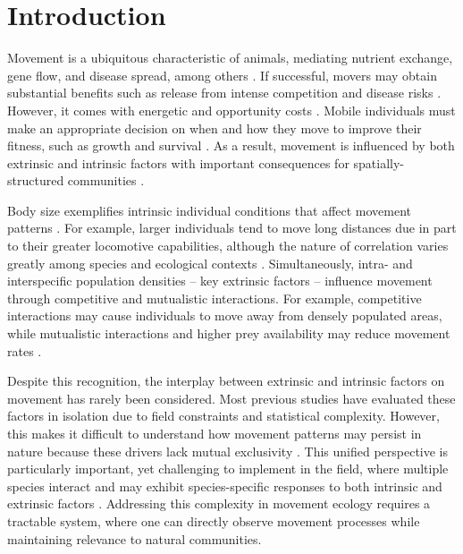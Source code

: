 \documentclass[11pt, class=article, crop=false]{standalone}
\begin{document}
\clearpage
{} 
\newpage

\section{Introduction}

Movement is a ubiquitous characteristic of animals, mediating nutrient exchange, gene flow, and disease spread, among others \citep{cookeMovementEcologyFishes2022, hessDiseaseMetapopulationModels1996, teruiParasiteInfectionInduces2017, fauschLandscapesRiverscapesBridging2002}.
If successful, movers may obtain substantial benefits such as release from intense competition and disease risks \citep{clobertDispersalEcologyEvolution2012, teruiParasiteInfectionInduces2017}.
However, it comes with energetic and opportunity costs \citep{bonteCostsDispersal2012}.
Mobile individuals must make an appropriate decision on when and how they move to improve their fitness, such as growth and survival \citep{bonteCostsDispersal2012}. As a result, movement is influenced by both extrinsic and intrinsic factors with important consequences for spatially-structured communities \citep{leiboldMetacommunityConceptFramework2004, mcpeekEvolutionPassiveDispersal2024, schlagelMovementmediatedCommunityAssembly2020}. 

Body size exemplifies intrinsic individual conditions that affect movement patterns \citep{clobertDispersalEcologyEvolution2012}. For example,  larger individuals tend to move long distances due in part to their greater locomotive capabilities, although the nature of correlation varies greatly among species and ecological contexts \citep{comteEvidenceDispersalSyndromes2018, teruiParasiteInfectionInduces2017, radingerPatternsPredictorsFish2014, debeffeConditiondependentNatalDispersal2012,gilliamMovementCorridorsEnhancement2001}.
Simultaneously, intra- and interspecific population densities -- key extrinsic factors -- influence movement through competitive and mutualistic interactions. For example, competitive interactions may cause individuals to move away from densely populated areas, while mutualistic interactions and higher prey availability may reduce movement rates \citep{thierryInterplayAbioticBiotic2024, rasmussenIndividualMovementStream2017, fronhoferBottomupTopdownControl2018}.

Despite this recognition, the interplay between extrinsic and intrinsic factors on movement has rarely been considered. Most previous studies have evaluated these factors in isolation due to field constraints and statistical complexity. However, this makes it difficult to understand how movement patterns may persist in nature because these drivers lack mutual exclusivity \citep{mcmahonLinkingHabitatSelection2006}. 
This unified perspective is particularly important, yet challenging to implement in the field, where multiple species interact and may exhibit species-specific responses to both intrinsic and extrinsic factors \citep{teruiNonrandomDispersalSympatric2021}. Addressing this complexity in movement ecology requires a tractable system, where one can directly observe movement processes while maintaining relevance to natural communities.
\end{document}
